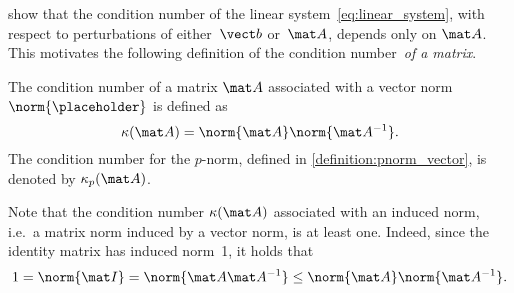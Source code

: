  show that
the condition number of the linear system~\eqref{eq:linear_system},
with respect to perturbations of either~$\vect b$ or~$\mat A$,
depends only on $\mat A$.
This motivates the following definition of the condition number~\emph{of a matrix}.
\begin{definition}
    The condition number of a matrix $\mat A$ associated with a vector norm $\norm{\placeholder}$ is defined as
    \[
        \kappa(\mat A) = \norm{\mat A} \norm{\mat A^{-1}}.
    \]
    The condition number for the $p$-norm,
    defined in \cref{definition:pnorm_vector},
    is denoted by $\kappa_p(\mat A)$.
\end{definition}
Note that the condition number $\kappa(\mat A)$ associated with an induced norm,
i.e.\ a matrix norm induced by a vector norm,
is at least one.
Indeed, since the identity matrix has induced norm~1,
it holds that
\[
    1 = \norm{\mat I} = \norm{\mat A \mat A^{-1}}\leq \norm{\mat A} \norm{\mat A^{-1}}.
\]

